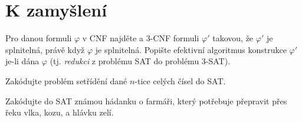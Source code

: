 \section*{K zamyšlení}
    
    
\begin{problem} 
    
    Pro danou formuli $\varphi$ v CNF najděte a 3-CNF formuli $\varphi'$ takovou, že $\varphi'$ je splnitelná, právě když $\varphi$ je splnitelná. Popište efektivní algoritmus konstrukce $\varphi'$ je-li dána $\varphi$ (tj. \emph{redukci} z problému SAT do problému 3-SAT).

\end{problem}


\begin{problem}
    Zakódujte problém setřídění dané $n$-tice celých čísel do SAT.
\end{problem}

\begin{problem}
    Zakódujte do SAT známou hádanku o farmáři, který potřebuje přepravit přes řeku vlka, kozu, a hlávku zelí.
\end{problem}
